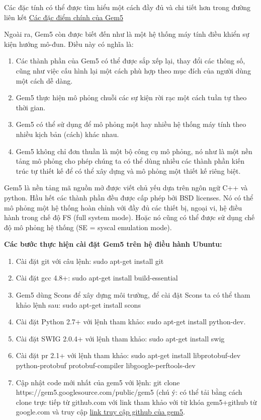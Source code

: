 \documentclass{article}
\begin{document}
Các đặc tính có thể được tìm hiểu một cách đầy đủ và chi tiết hơn trong đường liên kết \href{http://gem5.org/Main_Page}{Các đặc điểm chính của Gem5}

Ngoài ra, Gem5 còn được biết đến như là một hệ thống máy tính điều khiển sự kiện hướng mô-đun. Điều này có nghĩa là:

\begin{enumerate}
	\item Các thành phần của Gem5 có thể được sắp xếp lại, thay đổi các thông số, cũng như việc cấu hình lại một cách phù hợp theo mục đích của người dùng một cách dễ dàng.
	\item Gem5 thực hiện mô phỏng chuỗi các sự kiện rời rạc một cách tuần tự theo thời gian.
	\item Gem5 có thể sử dụng để mô phỏng một hay nhiều hệ thống máy tính theo nhiều kịch bản (cách) khác nhau.
	\item Gem5 không chỉ đơn thuần là một bộ công cụ mô phỏng, nó như là một nền tảng mô phỏng cho phép chúng ta có thể dùng nhiều các thành phần kiến trúc tự thiết kế để có thể xây dựng và mô phỏng một thiết kế riêng biệt. 
\end{enumerate}

Gem5 là nền tảng mã nguồn mở được viết chủ yếu dựa trên ngôn ngữ C++ và python. Hầu hết các thành phần đều được cấp phép bởi BSD licenses. Nó có thể mô phỏng một hệ thống hoàn chỉnh với đầy đủ các thiết bị, ngoại vi, hệ điều hành trong chế độ FS (full system mode). Hoặc nó cũng có thể được sử dụng chế độ mô phỏng hệ thống (SE = syscal emulation mode).

\textbf{Các bước thực hiện cài đặt Gem5 trên hệ điều hành Ubuntu:}
\begin{enumerate}
	\item Cài đặt git với câu lệnh: sudo apt-get install git
	\item Cài đặt gcc 4.8+: sudo apt-get install build-essential
	\item Gem5 dùng Scons để xây dựng môi trường, để cài đặt Scons ta có thể tham khảo lệnh sau: sudo apt-get install scons
	\item Cài đặt Python 2.7+ với lệnh tham khảo: sudo apt-get install python-dev.
	\item Cài đặt SWIG 2.0.4+ với lệnh tham khảo: sudo apt-get install swig
	\item Cài đặt pr 2.1+ với lệnh tham khảo: sudo apt-get install libprotobuf-dev python-protobuf protobuf-compiler libgoogle-perftools-dev
	\item Cập nhật code mới nhất của gem5 với lệnh: git clone https://gem5.googlesource.com/public/gem5 (chú ý: có thể tải bằng cách clone trực tiếp từ github.com với link tham khảo với từ khóa gem5+github từ google.com và truy cập \href{https://github.com/gem5/gem5}{link truy cập github của gem5}.
\end{enumerate}
\end{document}
